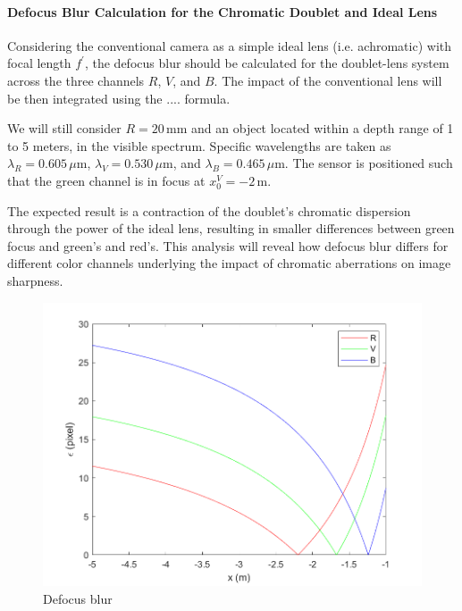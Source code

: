 \documentclass[10pt,letterpaper]{article}
\begin{document}
\paragraph{Defocus Blur Calculation for the Chromatic Doublet and Ideal Lens\\}

Considering the conventional camera as a simple ideal lens (i.e. achromatic) with focal length \(f^{\prime}\), the defocus blur should be calculated for the doublet-lens system across the three channels \(R\), \(V\), and \(B\). The impact of the conventional lens will be then integrated using the .... formula.

We will still consider \(R = 20 \, \text{mm}\) and an object located within a depth range of 1 to 5 meters, in the visible spectrum. Specific wavelengths are taken as \(\lambda_R = 0.605 \, \mu \mathrm{m}\), \(\lambda_V = 0.530 \, \mu \mathrm{m}\), and \(\lambda_B = 0.465 \, \mu \mathrm{m}\). The sensor is positioned such that the green channel is in focus at \(x_0^V = -2 \, \text{m}\).

The expected result is a contraction of the doublet's chromatic dispersion through the power of the ideal lens, resulting in smaller differences between green focus and green's and red's. This analysis will reveal how defocus blur differs for different color channels underlying the impact of chromatic aberrations on image sharpness.

\begin{figure}[h]
	\centering
	\includegraphics[scale=0.55]{flou_defocalisation_doublet_lentille_conventionnelle_RVB_optimise.png}
	\caption{Defocus blur}
	\label{fig:def-blur-2}
\end{figure}
\end{document}
